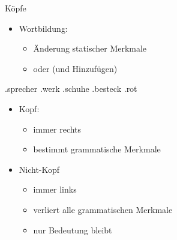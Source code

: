 \begin{frame}
  {Köpfe}
  \pause
  \begin{itemize}[<+->]
    \item Wortbildung:
      \begin{itemize}[<+->]
        \item Änderung statischer Merkmale
        \item oder  (und Hinzufügen) 
      \end{itemize}
      \Viertelzeile
  \end{itemize}
  \pause
  \begin{exe}
    \ex
    \begin{xlist}
      \ex {}.\alert<8->{sprecher} 
      \pause
      \pause
      \pause
      \ex {}.\alert<11->{werk} 
      \pause
      \pause
      \pause
      \ex {}.\alert<14->{schuhe} 
      \pause
      \pause
      \pause
      \ex {}.\alert<17->{besteck} 
      \pause
      \pause
      \pause
      \ex {}.\alert<20->{rot} 
      \pause
      \pause
    \end{xlist}
  \end{exe}
  \pause
  \begin{itemize}[<+->]
    \item \alert{Kopf}:
      \begin{itemize}[<+->]
        \item immer rechts
        \item bestimmt grammatische Merkmale
      \end{itemize}
    \item \alert{Nicht-Kopf}
      \begin{itemize}[<+->]
        \item immer links
        \item verliert alle grammatischen Merkmale
        \item nur Bedeutung bleibt
      \end{itemize}
  \end{itemize}
\end{frame}

